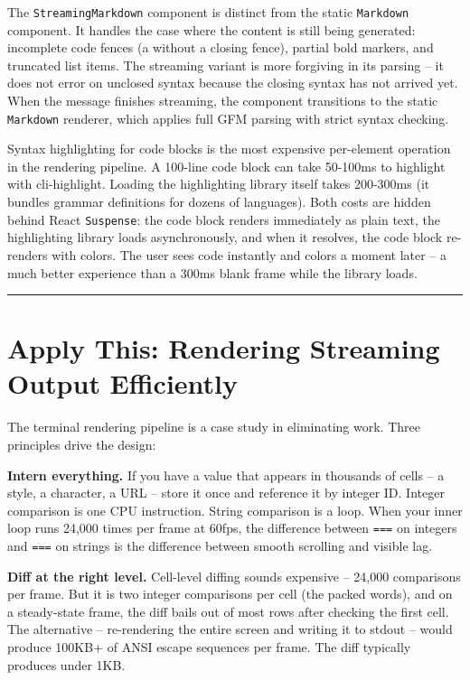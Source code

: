 \documentclass[
  english,
  11pt,
  letterpaper,
]{book}
\begin{document}
The \texttt{StreamingMarkdown} component is distinct from the static
\texttt{Markdown} component. It handles the case where the content is
still being generated: incomplete code fences (a
\texttt{\textasciigrave{}\textasciigrave{}\textasciigrave{}} without a
closing fence), partial bold markers, and truncated list items. The
streaming variant is more forgiving in its parsing -- it does not error
on unclosed syntax because the closing syntax has not arrived yet. When
the message finishes streaming, the component transitions to the static
\texttt{Markdown} renderer, which applies full GFM parsing with strict
syntax checking.

Syntax highlighting for code blocks is the most expensive per-element
operation in the rendering pipeline. A 100-line code block can take
50-100ms to highlight with cli-highlight. Loading the highlighting
library itself takes 200-300ms (it bundles grammar definitions for
dozens of languages). Both costs are hidden behind React
\texttt{Suspense}: the code block renders immediately as plain text, the
highlighting library loads asynchronously, and when it resolves, the
code block re-renders with colors. The user sees code instantly and
colors a moment later -- a much better experience than a 300ms blank
frame while the library loads.

\begin{center}\rule{0.5\linewidth}{0.5pt}\end{center}

\section{Apply This: Rendering Streaming Output
Efficiently}\label{apply-this-rendering-streaming-output-efficiently}

The terminal rendering pipeline is a case study in eliminating work.
Three principles drive the design:

\textbf{Intern everything.} If you have a value that appears in
thousands of cells -- a style, a character, a URL -- store it once and
reference it by integer ID. Integer comparison is one CPU instruction.
String comparison is a loop. When your inner loop runs 24,000 times per
frame at 60fps, the difference between \texttt{===} on integers and
\texttt{===} on strings is the difference between smooth scrolling and
visible lag.

\textbf{Diff at the right level.} Cell-level diffing sounds expensive --
24,000 comparisons per frame. But it is two integer comparisons per cell
(the packed words), and on a steady-state frame, the diff bails out of
most rows after checking the first cell. The alternative -- re-rendering
the entire screen and writing it to stdout -- would produce 100KB+ of
ANSI escape sequences per frame. The diff typically produces under 1KB.
\end{document}
